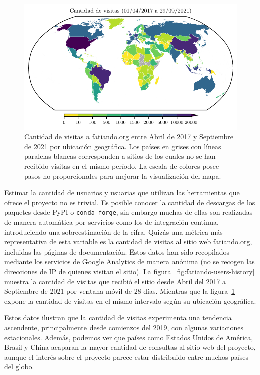 \begin{figure}
    \centering
    \includegraphics[width=\linewidth]{figs/fatiando/users_map.pdf}
    \caption{
        Cantidad de visitas a \href{https://fatiando.org}{fatiando.org} entre
        Abril de 2017 y Septiembre de 2021 por ubicación geográfica.
        Los países en grises con líneas paralelas blancas corresponden a sitios
        de los cuales no se han recibido visitas en el mismo período.
        La escala de colores posee pasos no proporcionales para mejorar la
        visualización del mapa.
    }
    \label{fig:fatiando-users-map}
\end{figure}

Estimar la cantidad de usuarios y usuarias que utilizan las herramientas que
ofrece el proyecto no es trivial.
Es posible conocer la cantidad de descargas de los paquetes desde PyPI
o \texttt{conda-forge}, sin embargo muchas de ellas son realizadas de manera
automática por servicios como los de integración continua, introduciendo una
sobreestimación de la cifra.
Quizás una métrica más representativa de esta variable es la cantidad de
visitas al sitio web \href{https://fatiando.org}{fatiando.org}, incluidas las
páginas de documentación.
Estos datos han sido recopilados mediante los servicios de Google Analytics de
manera anónima (no se recogen las direcciones de IP de quienes visitan el
sitio).
La figura~\ref{fig:fatiando-users-history} muestra la cantidad de visitas que
recibió el sitio desde Abril del 2017 a Septiembre de 2021 por ventana móvil de
28 días.
Mientras que la figura~\ref{fig:fatiando-users-map} expone la cantidad de
visitas en el mismo intervalo según su ubicación geográfica.

Estos datos ilustran que la cantidad de visitas experimenta una tendencia
ascendente, principalmente desde comienzos del 2019, con algunas variaciones
estacionales.
Además, podemos ver que países como Estados Unidos de América, Brasil y China
acaparan la mayor cantidad de consultas al sitio web del proyecto,
aunque el interés sobre el proyecto parece estar distribuido entre muchos
países del globo.





